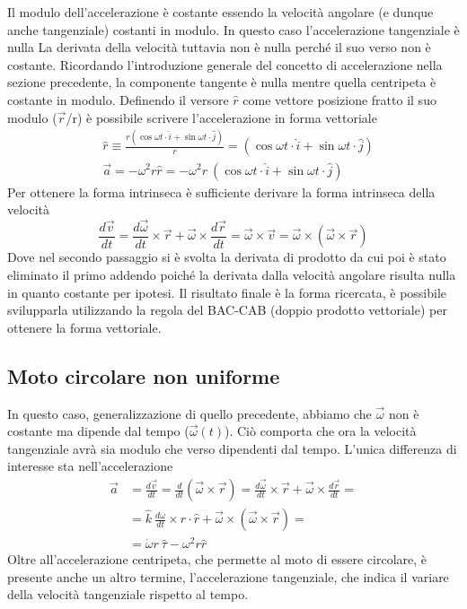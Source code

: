 Il modulo dell'accelerazione è costante essendo la velocità angolare (e dunque anche tangenziale) costanti in modulo. In questo caso l'accelerazione tangenziale è nulla La derivata della velocità tuttavia non è nulla perché il suo verso non è costante. Ricordando l'introduzione generale del concetto di accelerazione nella sezione precedente, la componente tangente è nulla mentre quella centripeta è costante in modulo. Definendo il versore $\hat{r}$ come vettore posizione fratto il suo modulo ($\vec{r}$/r) è possibile scrivere l'accelerazione in forma vettoriale
\begin{align*}
	&\hat{r} \equiv \frac{r(\cos\omega t \cdot \hat{i} + \sin \omega t \cdot \hat{j})}{r} = (\cos\omega t \cdot \hat{i} + \sin \omega t \cdot \hat{j})\\
	&\vec{a} = -\omega^2 r \hat{r} = -\omega^2 r\ (\cos\omega t \cdot \hat{i} + \sin \omega t \cdot \hat{j})
\end{align*}
Per ottenere la forma intrinseca è sufficiente derivare la forma intrinseca della velocità
\begin{equation*}
	\frac{d\vec{v}}{dt} = \frac{d\vec{\omega}}{dt} \times \vec{r} + \vec{\omega} \times \frac{d\vec{r}}{dt} = \vec{\omega} \times \vec{v} = \vec{\omega} \times (\vec{\omega} \times \vec{r})
\end{equation*}
Dove nel secondo passaggio si è svolta la derivata di prodotto da cui poi è stato eliminato il primo addendo poiché la derivata dalla velocità angolare risulta nulla in quanto costante per ipotesi. Il risultato finale è la forma ricercata, è possibile svilupparla utilizzando la regola del BAC-CAB (doppio prodotto vettoriale) per ottenere la forma vettoriale. 
\subsection{Moto circolare non uniforme}
In questo caso, generalizzazione di quello precedente, abbiamo che $\vec{\omega}$ non è costante ma dipende dal tempo ($\vec{\omega}(t)$). Ciò comporta che ora la velocità tangenziale avrà sia modulo che verso dipendenti dal tempo. L'unica differenza di interesse sta nell'accelerazione
\begin{align*}
	\vec{a} &=\frac{d\vec{v}}{dt}= \frac{d}{dt} (\vec{\omega} \times \vec{r}) = \frac{d\vec{\omega}}{dt} \times \vec{r} + \vec{\omega} \times \frac{d\vec{r}}{dt} =\\
	 &=\hat{k}\ \frac{d\omega}{dt} \times r \cdot \hat{r} + \vec{\omega} \times (\vec{\omega} \times \vec{r}) =\\ &=\dot{\omega} r\ \hat{\tau} - \omega^2 r \hat{r}
\end{align*}
Oltre all'accelerazione centripeta, che permette al moto di essere circolare, è presente anche un altro termine, l'accelerazione tangenziale, che indica il variare della velocità tangenziale rispetto al tempo.
